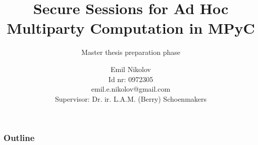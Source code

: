 \documentclass[t,aspectratio=169]{beamer}
\title{Secure Sessions for Ad Hoc Multiparty Computation in MPyC}
\subtitle{Master thesis preparation phase}
\author{Emil Nikolov \\ Id nr: 0972305 \\ emil.e.nikolov@gmail.com \\ Supervisor: Dr. ir. L.A.M. (Berry) Schoenmakers}
\begin{document}
\let\inputmintedorg\inputminted
\renewcommand{\inputminted}[2]{%
  \begin{mdframed}
    \inputmintedorg[linenos=true,fontsize=\tiny,breaklines=true,breakanywhere=true]{#1}{#2}
  \end{mdframed}
}

\begin{titleframe}[variant=1,bgimage=titlebgimg.jpg]
\end{titleframe}

\title{}


\begin{frame}
  \frametitle{Outline}
  \tableofcontents
\end{frame}



\end{document}
